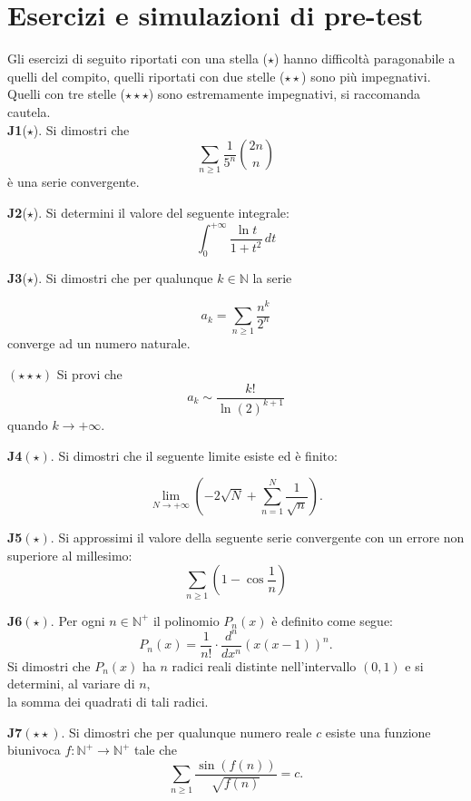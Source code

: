 \documentclass[a4paper,twoside]{article}
\theoremstyle{definition}
\numberwithin{theorem}{section}
\begin{document}
\section{Esercizi e simulazioni di pre-test}
Gli esercizi di seguito riportati con una stella ($\star$) hanno difficoltà paragonabile a quelli del compito, quelli riportati con due stelle ($\star\star$) sono più impegnativi. Quelli con tre stelle ($\star\star\star$) sono estremamente impegnativi, si raccomanda cautela.\\


 \textbf{J1}($\star$). Si dimostri che 
\begin{equation*}
 \sum_{n\geq 1}\frac{1}{5^n}\binom{2n}{n}   
\end{equation*}
è una serie convergente.


\textbf{J2}($\star$). Si determini il valore del seguente integrale: 
\begin{equation*}
 \int_{0}^{+\infty}\frac{\ln t}{1+t^2}\,dt   
\end{equation*}


\textbf{J3}($\star$). Si dimostri che per qualunque $k\in\mathbb{N}$ la serie

 \begin{equation*}
    a_k = \sum_{n\geq 1}\frac{n^k}{2^n} 
 \end{equation*}
converge ad un numero naturale.  \par
$(\star\star\star)$ Si provi che 
\begin{equation*}
    a_k\sim \frac{k!}{\ln(2)^{k+1}}
\end{equation*} quando $k\to +\infty$.


\textbf{J4}$(\star)$. Si dimostri che il seguente limite esiste ed è finito:

$$ \lim_{N\to +\infty}\left(-2\sqrt{N}+\sum_{n=1}^{N}\frac{1}{\sqrt{n}}\right).$$

\textbf{J5}$(\star)$. Si approssimi il valore della seguente serie convergente con un errore non superiore al millesimo:
$$ \sum_{n\geq 1}\left(1-\cos\frac{1}{n}\right)$$

\textbf{J6}$(\star)$. Per ogni $n\in\mathbb{N}^+$ il polinomio $P_n(x)$ è definito come segue:
$$ P_n(x) = \frac{1}{n!}\cdot\frac{d^n}{dx^n}\left(x(x-1)\right)^n.$$
Si dimostri che $P_n(x)$ ha $n$ radici reali distinte nell'intervallo $(0,1)$ e si determini, al variare di $n$,\\ la somma dei quadrati di tali radici.

\textbf{J7}$(\star\star)$. Si dimostri che per qualunque numero reale $c$ esiste una funzione biunivoca $f:\mathbb{N}^+\to\mathbb{N}^+$ tale che 
$$ \sum_{n\geq 1}\frac{\sin(f(n))}{\sqrt{f(n)}} = c.$$
\end{document}
